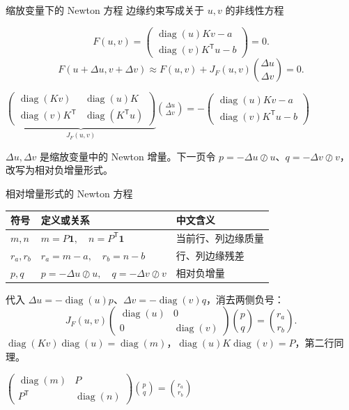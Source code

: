 \documentclass[aspectratio=169,11pt]{ctexbeamer}
\newcommand{\diag}{\operatorname{diag}}
\newcommand{\vone}{\bm{1}}
\newcommand{\trans}{\mathsf{T}}
\newcommand{\tagline}[1]{{\color{muted}\small #1}}
\newcommand{\source}[1]{\par\vfill{\color{muted}\fontsize{6.8}{9}\selectfont\raggedright #1\par}}
\newcommand{\keyeq}[1]{\par\begingroup\setlength{\fboxsep}{7pt}\centering\colorbox{pale}{$\displaystyle #1$}\par\endgroup}
\begin{document}
\begin{frame}{缩放变量下的 Newton 方程}
\tagline{边缘约束写成关于 $u,v$ 的非线性方程}\par
\[
F(u,v)=
\begin{pmatrix}
\diag(u)Kv-a\\[2pt]
\diag(v)K^{\trans}u-b
\end{pmatrix}=0.
\]
\vspace{2mm}
\[
F(u+\Delta u,v+\Delta v)
\approx F(u,v)+J_F(u,v)\binom{\Delta u}{\Delta v}=0.
\]
\vspace{2mm}
\keyeq{
\underbrace{\begin{pmatrix}
\diag(Kv)&\diag(u)K\\[2pt]
\diag(v)K^{\trans}&\diag(K^{\trans}u)
\end{pmatrix}}_{J_F(u,v)}
\binom{\Delta u}{\Delta v}
=-\begin{pmatrix}
\diag(u)Kv-a\\[2pt]
\diag(v)K^{\trans}u-b
\end{pmatrix}}
\source{$\Delta u,\Delta v$ 是缩放变量中的 Newton 增量。下一页令 $p=-\Delta u\oslash u$、$q=-\Delta v\oslash v$，改写为相对负增量形式。}
\end{frame}

\begin{frame}{相对增量形式的 Newton 方程}
\begingroup
\fontsize{9.5}{11.5}\selectfont
\renewcommand{\arraystretch}{1.18}
\begin{tabular*}{\textwidth}{@{}l@{\extracolsep{\fill}}ll@{}}
\toprule
\textbf{符号}&\textbf{定义或关系}&\textbf{中文含义}\\
\midrule
$m,n$ & $m=P\vone,\quad n=P^{\trans}\vone$ & 当前行、列边缘质量\\
$r_a,r_b$ & $r_a=m-a,\quad r_b=n-b$ & 行、列边缘残差\\
$p,q$ & $p=-\Delta u\oslash u,\quad q=-\Delta v\oslash v$ & 相对负增量\\
\bottomrule
\end{tabular*}
\endgroup
\par
\vspace{2mm}
{\small 代入 $\Delta u=-\diag(u)p$、$\Delta v=-\diag(v)q$，消去两侧负号：}
\[
J_F(u,v)
\begin{pmatrix}\diag(u)&0\\0&\diag(v)\end{pmatrix}
\binom pq=\binom{r_a}{r_b}.
\]
{\small\color{muted}
$\diag(Kv)\diag(u)=\diag(m)$，$\diag(u)K\diag(v)=P$，第二行同理。}
\vspace{2mm}
\keyeq{\begin{pmatrix}\diag(m)&P\\P^{\trans}&\diag(n)\end{pmatrix}\binom pq=\binom{r_a}{r_b}}
\end{frame}
\end{document}

